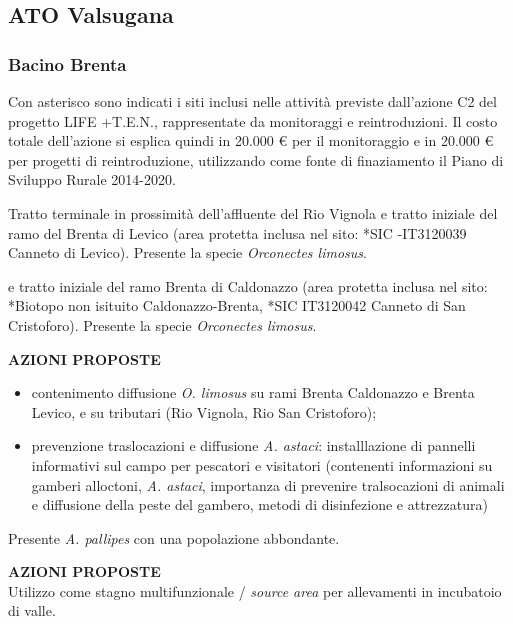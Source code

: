 \documentclass[11pt,a4paper,italian,twoside,openany]{memoir}
\begin{document}
\subsection{ATO Valsugana}
\subsubsection{Bacino Brenta}
Con asterisco sono indicati i siti inclusi nelle attività previste dall’azione C2 del progetto LIFE +T.E.N., rappresentate da  monitoraggi e reintroduzioni. Il costo totale dell’azione si esplica quindi in 20.000 € per il monitoraggio e in 20.000 € per progetti di reintroduzione, utilizzando come fonte di finaziamento il Piano di Sviluppo Rurale 2014-2020.\\

\begin{description}\itemsep0pt
\item[Lago Levico] Tratto terminale in prossimità dell'affluente del Rio Vignola e tratto iniziale del ramo del Brenta di Levico (area protetta inclusa nel sito: *SIC -IT3120039 Canneto di Levico). Presente la specie \emph{Orconectes limosus}.

\item[Lago di Caldonazzo] e tratto iniziale del ramo Brenta di Caldonazzo (area protetta inclusa nel sito: *Biotopo non isituito Caldonazzo-Brenta, *SIC IT3120042 Canneto di San Cristoforo). Presente la specie \emph{Orconectes limosus}.

\textbf{AZIONI PROPOSTE}\\

\begin{itemize}\itemsep0pt 
  \item contenimento diffusione \emph{O. limosus} su rami Brenta Caldonazzo e Brenta Levico, e su tributari (Rio Vignola, Rio San Cristoforo);
  \item prevenzione traslocazioni e diffusione \emph{A. astaci}: installlazione di pannelli informativi sul campo per pescatori e visitatori (contenenti informazioni su gamberi alloctoni, \emph{A. astaci}, importanza di prevenire tralsocazioni di animali e diffusione della peste del gambero, metodi di disinfezione e attrezzatura)
\end{itemize}
\item[Stagno artificiale nel parco della stazione ferroviaria di Grigno] Presente \emph{A. pallipes} con una popolazione abbondante.

\textbf{AZIONI PROPOSTE}\\
Utilizzo come stagno multifunzionale / \emph{source area} per allevamenti in incubatoio di valle.


\end{description}
\end{document}
